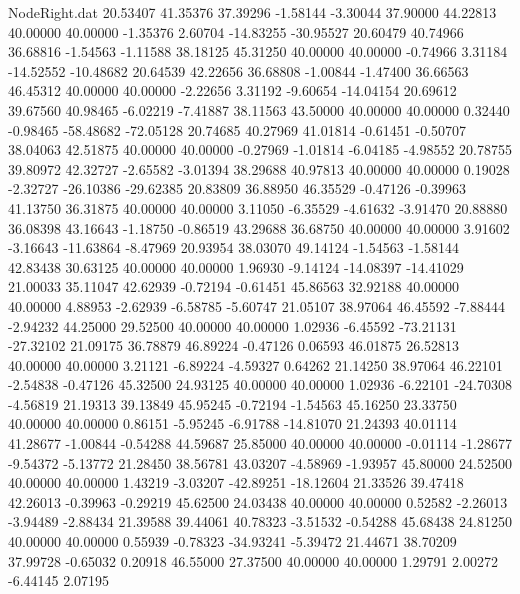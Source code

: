 \begin{filecontents}{NodeRight.dat}
  20.53407   41.35376   37.39296    -1.58144   -3.30044   37.90000   44.22813   40.00000   40.00000   -1.35376    2.60704  -14.83255  -30.95527
  20.60479   40.74966   36.68816    -1.54563   -1.11588   38.18125   45.31250   40.00000   40.00000   -0.74966    3.31184  -14.52552  -10.48682
  20.64539   42.22656   36.68808    -1.00844   -1.47400   36.66563   46.45312   40.00000   40.00000   -2.22656    3.31192   -9.60654  -14.04154
  20.69612   39.67560   40.98465    -6.02219   -7.41887   38.11563   43.50000   40.00000   40.00000    0.32440   -0.98465  -58.48682  -72.05128
  20.74685   40.27969   41.01814    -0.61451   -0.50707   38.04063   42.51875   40.00000   40.00000   -0.27969   -1.01814   -6.04185   -4.98552
  20.78755   39.80972   42.32727    -2.65582   -3.01394   38.29688   40.97813   40.00000   40.00000    0.19028   -2.32727  -26.10386  -29.62385
  20.83809   36.88950   46.35529    -0.47126   -0.39963   41.13750   36.31875   40.00000   40.00000    3.11050   -6.35529   -4.61632   -3.91470
  20.88880   36.08398   43.16643    -1.18750   -0.86519   43.29688   36.68750   40.00000   40.00000    3.91602   -3.16643  -11.63864   -8.47969
  20.93954   38.03070   49.14124    -1.54563   -1.58144   42.83438   30.63125   40.00000   40.00000    1.96930   -9.14124  -14.08397  -14.41029
  21.00033   35.11047   42.62939    -0.72194   -0.61451   45.86563   32.92188   40.00000   40.00000    4.88953   -2.62939   -6.58785   -5.60747
  21.05107   38.97064   46.45592    -7.88444   -2.94232   44.25000   29.52500   40.00000   40.00000    1.02936   -6.45592  -73.21131  -27.32102
  21.09175   36.78879   46.89224    -0.47126    0.06593   46.01875   26.52813   40.00000   40.00000    3.21121   -6.89224   -4.59327    0.64262
  21.14250   38.97064   46.22101    -2.54838   -0.47126   45.32500   24.93125   40.00000   40.00000    1.02936   -6.22101  -24.70308   -4.56819
  21.19313   39.13849   45.95245    -0.72194   -1.54563   45.16250   23.33750   40.00000   40.00000    0.86151   -5.95245   -6.91788  -14.81070
  21.24393   40.01114   41.28677    -1.00844   -0.54288   44.59687   25.85000   40.00000   40.00000   -0.01114   -1.28677   -9.54372   -5.13772
  21.28450   38.56781   43.03207    -4.58969   -1.93957   45.80000   24.52500   40.00000   40.00000    1.43219   -3.03207  -42.89251  -18.12604
  21.33526   39.47418   42.26013    -0.39963   -0.29219   45.62500   24.03438   40.00000   40.00000    0.52582   -2.26013   -3.94489   -2.88434
  21.39588   39.44061   40.78323    -3.51532   -0.54288   45.68438   24.81250   40.00000   40.00000    0.55939   -0.78323  -34.93241   -5.39472
  21.44671   38.70209   37.99728    -0.65032    0.20918   46.55000   27.37500   40.00000   40.00000    1.29791    2.00272   -6.44145    2.07195

\end{filecontents}
